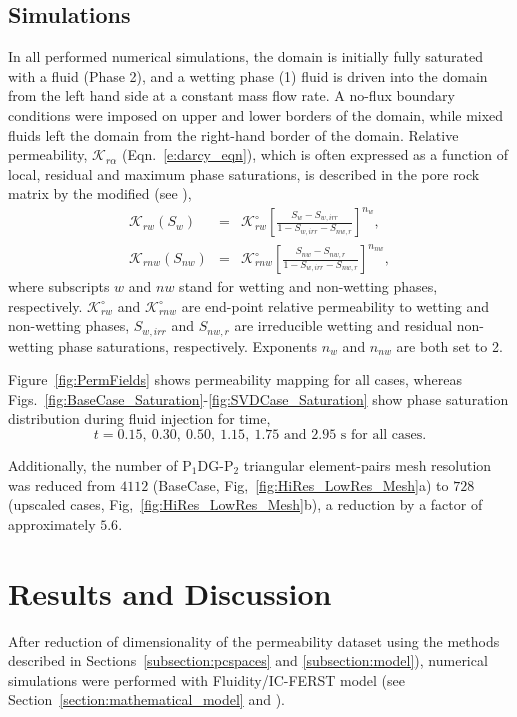 \documentclass[preprint,12pt]{elsarticle}
\newcommand{\frc}{\displaystyle\frac}
\newcommand{\PN}[2][error]{P$_{#1}$DG-P$_{#2}$}
\begin{document}
\subsection{Simulations}\label{subsection:simulations}
In all performed numerical simulations, the domain is initially fully saturated with a fluid (Phase 2), and a wetting phase (1) fluid is driven into the domain from the left hand side at a constant mass flow rate. A no-flux boundary conditions were imposed on upper and lower borders of the domain, while mixed fluids left the domain from the right-hand border of the domain. Relative permeability, $\mathcal{K}_{r\alpha}$ (Eqn.~\ref{e:darcy_eqn}), which is often expressed as a function of local, residual and maximum phase saturations, is described in the pore rock matrix by the modified \citet{Brooks_1964} (see \citep{alpak_1999}),
\begin{eqnarray}
  \mathcal{K}_{rw}\left(S_{w}\right) &=& \mathcal{K}^{\circ}_{rw}\left[\frc{S_{w}-S_{w,irr}}{1-S_{w,irr}-S_{nw,r}}\right]^{n_{w}}, \label{Eqn:CoreyBrooks1}\\
  \mathcal{K}_{rnw}\left(S_{nw}\right) &=& \mathcal{K}^{\circ}_{rnw}\left[\frc{S_{nw}-S_{nw,r}}{1-S_{w,irr}-S_{nw,r}}\right]^{n_{nw}}, \label{Eqn:CoreyBrooks2}
\end{eqnarray}
where subscripts $w$ and $nw$ stand for wetting and non-wetting phases, respectively. $\mathcal{K}^{\circ}_{rw}$ and $\mathcal{K}^{\circ}_{rnw}$ are end-point relative permeability to wetting and non-wetting phases, $S_{w,irr}$ and $S_{nw,r}$ are irreducible wetting and residual non-wetting phase saturations, respectively. Exponents $n_{w}$ and $n_{nw}$ are both set to 2.

Figure~\ref{fig:PermFields} shows permeability mapping for all cases, whereas Figs.~\ref{fig:BaseCase_Saturation}-\ref{fig:SVDCase_Saturation} show phase saturation distribution during fluid injection for time,
\begin{displaymath}
  t = 0.15,~0.30,~0.50,~1.15,~1.75\text{ and } 2.95 \text{ s for all cases.} 
\end{displaymath}

Additionally, the number of \PN[1]{2} triangular element-pairs mesh resolution was reduced from $4112$ (BaseCase, Fig,~\ref{fig:HiRes_LowRes_Mesh}a) to $728$ (upscaled cases, Fig,~\ref{fig:HiRes_LowRes_Mesh}b), a reduction by a factor of approximately $5.6$.

\section{Results and Discussion}\label{section:results_discussion}
After reduction of dimensionality of the permeability dataset using the methods described in Sections~\ref{subsection:pcspaces} and \ref{subsection:model}), numerical simulations were performed with Fluidity/IC-FERST model (see Section~\ref{section:mathematical_model} and \cite{Gomes_2017, jackson_2013,salinas_2018}).
\end{document}
